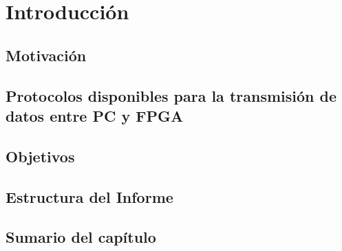 \chapter{Introducción}
	\label{cap:int}
	
	\section{Motivación}
		\label{int:mot}
		
	\section{Protocolos disponibles para la transmisión de datos entre PC y FPGA}
		\label{int:pro}
		
	\section{Objetivos}
		\label{int:obj}
		
	\section{Estructura del Informe}
		\label{int:est}
		
	\section{Sumario del capítulo} 
		\label{int:res}
		
		
%	
%	